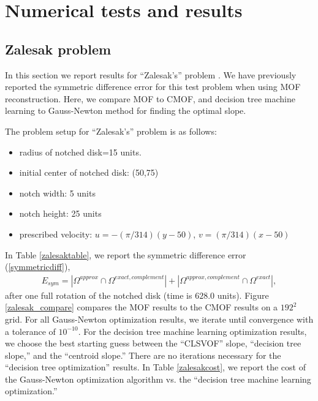 \documentclass[]{article}
\begin{document}
\section{Numerical tests and results}

\subsection{Zalesak problem}

In this section we report results for ``Zalesak's'' problem 
\cite{zalesak1979fully}.  We have previously reported the 
symmetric difference error for this test problem when using 
MOF reconstruction\cite{jemison2013coupled}.  
Here, we compare MOF to CMOF, and decision
tree machine learning to Gauss-Newton method for finding the
optimal slope.  

The problem setup for ``Zalesak's'' problem is as follows:
\begin{itemize}
	\item radius of notched disk=15 units.
	\item initial center of notched disk: (50,75)
	\item notch width: 5 units
	\item notch height: 25 units
	\item prescribed velocity: $u=-(\pi/314)(y-50)$,
		$v=(\pi/314)(x-50)$
\end{itemize}

In Table \ref{zalesaktable}, we report the symmetric difference
error (\ref{symmetricdiff}),
\begin{eqnarray}
	E_{sym}=
	|\Omega^{approx}\cap\Omega^{exact,complement}|+
	|\Omega^{approx,complement}\cap\Omega^{exact}|,
	\label{symmetricdiff}
\end{eqnarray}
after one full rotation of the notched disk (time is $628.0$
units).  Figure \ref{zalesak_compare} compares the MOF results to the
CMOF results on a $192^{2}$ grid.  For all Gauss-Newton
optimization results, we iterate until convergence with 
a tolerance of $10^{-10}$.  For the decision tree machine 
learning optimization results, we choose the best starting 
guess between the ``CLSVOF'' slope, ``decision tree slope,''
and the ``centroid slope.''  There are no iterations necessary
for the ``decision tree optimization'' results. 
In Table \ref{zalesakcost}, we report the cost of the 
Gauss-Newton optimization algorithm vs. the
``decision tree machine learning optimization.''
\end{document}

